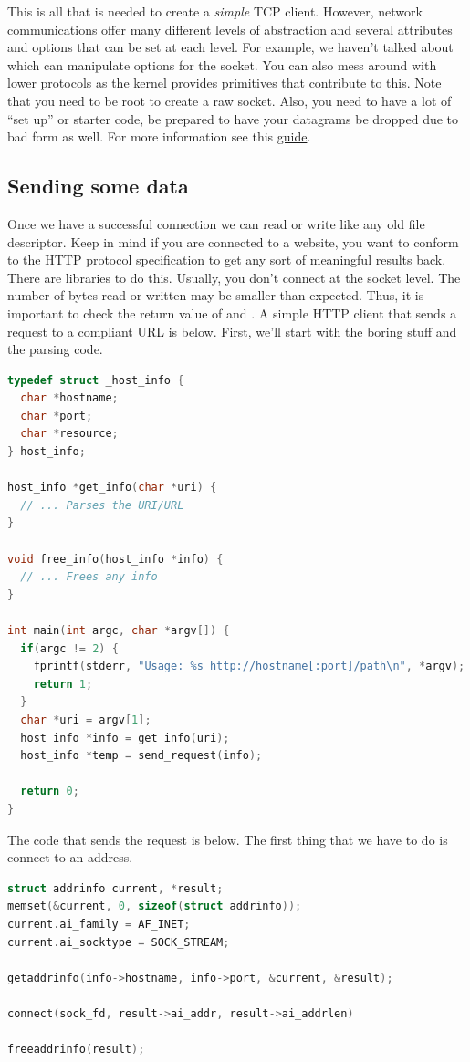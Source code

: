 This is all that is needed to create a \textit{simple} TCP client.
However, network communications offer many different levels of abstraction and several attributes and options that can be set at each level.
For example, we haven't talked about  which can manipulate options for the socket.
You can also mess around with lower protocols as the kernel provides primitives that contribute to this.
Note that you need to be root to create a raw socket.
Also, you need to have a lot of ``set up'' or starter code, be prepared to have your datagrams be dropped due to bad form as well.
For more information see this \href{http://www.beej.us/guide/bgnet/output/html/multipage/getaddrinfoman.html}{guide}.

\subsection{Sending some data}

Once we have a successful connection we can read or write like any old file descriptor.
Keep in mind if you are connected to a website, you want to conform to the HTTP protocol specification to get any sort of meaningful results back.
There are libraries to do this.
Usually, you don't connect at the socket level.
The number of bytes read or written may be smaller than expected.
Thus, it is important to check the return value of  and .
A simple HTTP client that sends a request to a compliant URL is below.
First, we'll start with the boring stuff and the parsing code.

\begin{lstlisting}[language=C]
typedef struct _host_info {
  char *hostname;
  char *port;
  char *resource;
} host_info;

host_info *get_info(char *uri) {
  // ... Parses the URI/URL
}

void free_info(host_info *info) {
  // ... Frees any info
}

int main(int argc, char *argv[]) {
  if(argc != 2) {
    fprintf(stderr, "Usage: %s http://hostname[:port]/path\n", *argv);
    return 1;
  }
  char *uri = argv[1];
  host_info *info = get_info(uri);
  host_info *temp = send_request(info);

  return 0;
}
\end{lstlisting}

The code that sends the request is below.
The first thing that we have to do is connect to an address.

\begin{lstlisting}[language=C]
struct addrinfo current, *result;
memset(&current, 0, sizeof(struct addrinfo));
current.ai_family = AF_INET;
current.ai_socktype = SOCK_STREAM;

getaddrinfo(info->hostname, info->port, &current, &result);

connect(sock_fd, result->ai_addr, result->ai_addrlen)

freeaddrinfo(result);
\end{lstlisting}

